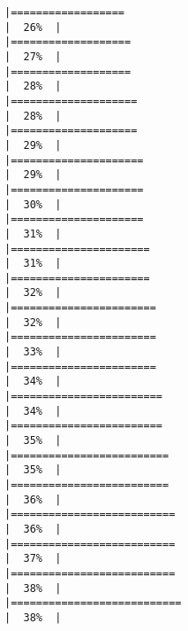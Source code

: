 \documentclass[
]{article}
\begin{document}
\begin{verbatim}
|==================                                                    |  26%  |                                                                              |===================                                                   |  27%  |                                                                              |===================                                                   |  28%  |                                                                              |====================                                                  |  28%  |                                                                              |====================                                                  |  29%  |                                                                              |=====================                                                 |  29%  |                                                                              |=====================                                                 |  30%  |                                                                              |=====================                                                 |  31%  |                                                                              |======================                                                |  31%  |                                                                              |======================                                                |  32%  |                                                                              |=======================                                               |  32%  |                                                                              |=======================                                               |  33%  |                                                                              |=======================                                               |  34%  |                                                                              |========================                                              |  34%  |                                                                              |========================                                              |  35%  |                                                                              |=========================                                             |  35%  |                                                                              |=========================                                             |  36%  |                                                                              |==========================                                            |  36%  |                                                                              |==========================                                            |  37%  |                                                                              |==========================                                            |  38%  |                                                                              |===========================                                           |  38%  |                                                                              
\end{verbatim}
\end{document}
